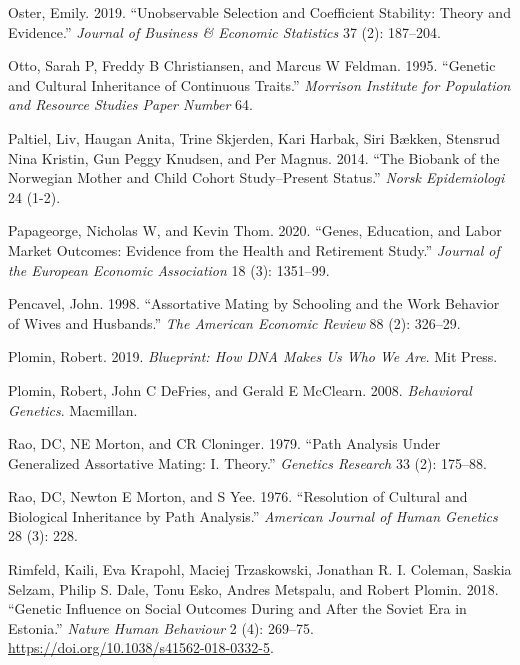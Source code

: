 \documentclass[
  12pt,
]{article}
\newlength{\cslhangindent}
\newlength{\cslentryspacingunit} %
\newenvironment{CSLReferences}[2] %
 {%
  \setlength{\parindent}{0pt}
  \ifodd #1
  \let\oldpar\par
  \def\par{\hangindent=\cslhangindent\oldpar}
  \fi
  \setlength{\parskip}{#2\cslentryspacingunit}
 }%
 {}
\theoremstyle{definition}
\theoremstyle{definition}
\theoremstyle{definition}
\theoremstyle{definition}
\theoremstyle{remark}
\begin{document}
\begin{CSLReferences}{1}{0}
\leavevmode{}%
Oster, Emily. 2019. {``Unobservable Selection and Coefficient Stability: Theory and Evidence.''} \emph{Journal of Business \& Economic Statistics} 37 (2): 187--204.

\leavevmode{}%
Otto, Sarah P, Freddy B Christiansen, and Marcus W Feldman. 1995. {``Genetic and Cultural Inheritance of Continuous Traits.''} \emph{Morrison Institute for Population and Resource Studies Paper Number} 64.

\leavevmode{}%
Paltiel, Liv, Haugan Anita, Trine Skjerden, Kari Harbak, Siri Bækken, Stensrud Nina Kristin, Gun Peggy Knudsen, and Per Magnus. 2014. {``The Biobank of the Norwegian Mother and Child Cohort Study--Present Status.''} \emph{Norsk Epidemiologi} 24 (1-2).

\leavevmode{}%
Papageorge, Nicholas W, and Kevin Thom. 2020. {``Genes, Education, and Labor Market Outcomes: Evidence from the Health and Retirement Study.''} \emph{Journal of the European Economic Association} 18 (3): 1351--99.

\leavevmode{}%
Pencavel, John. 1998. {``Assortative Mating by Schooling and the Work Behavior of Wives and Husbands.''} \emph{The American Economic Review} 88 (2): 326--29.

\leavevmode{}%
Plomin, Robert. 2019. \emph{Blueprint: How DNA Makes Us Who We Are}. Mit Press.

\leavevmode{}%
Plomin, Robert, John C DeFries, and Gerald E McClearn. 2008. \emph{Behavioral Genetics}. Macmillan.

\leavevmode{}%
Rao, DC, NE Morton, and CR Cloninger. 1979. {``Path Analysis Under Generalized Assortative Mating: I. Theory.''} \emph{Genetics Research} 33 (2): 175--88.

\leavevmode{}%
Rao, DC, Newton E Morton, and S Yee. 1976. {``Resolution of Cultural and Biological Inheritance by Path Analysis.''} \emph{American Journal of Human Genetics} 28 (3): 228.

\leavevmode{}%
Rimfeld, Kaili, Eva Krapohl, Maciej Trzaskowski, Jonathan R. I. Coleman, Saskia Selzam, Philip S. Dale, Tonu Esko, Andres Metspalu, and Robert Plomin. 2018. {``Genetic Influence on Social Outcomes During and After the Soviet Era in Estonia.''} \emph{Nature Human Behaviour} 2 (4): 269--75. \url{https://doi.org/10.1038/s41562-018-0332-5}.


\end{CSLReferences}
\end{document}
